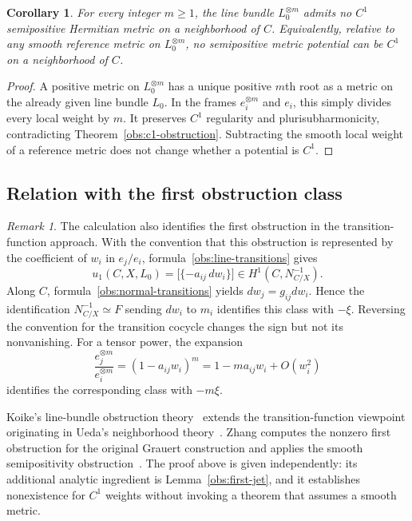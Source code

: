 \documentclass[11pt,a4paper]{article}
\numberwithin{equation}{section}
\newtheorem{corollary}[theorem]{Corollary}
\theoremstyle{definition}
\theoremstyle{remark}
\newtheorem{remark}[theorem]{Remark}
\begin{document}
\begin{corollary}
\label{obs:powers}
For every integer $m\geq1$, the line bundle $L_0^{\otimes m}$ admits
no $C^1$ semipositive Hermitian metric on a neighborhood of $C$.
Equivalently, relative to any smooth reference metric on
$L_0^{\otimes m}$, no semipositive metric potential can be $C^1$ on a
neighborhood of $C$.
\end{corollary}

\begin{proof}
A positive metric on $L_0^{\otimes m}$ has a unique positive $m$th root
as a metric on the already given line bundle $L_0$.  In the frames
$e_i^{\otimes m}$ and $e_i$, this simply divides every local weight by
$m$.  It preserves $C^1$ regularity and plurisubharmonicity, contradicting
Theorem~\ref{obs:c1-obstruction}.  Subtracting the smooth local weight
of a reference metric does not change whether a potential is $C^1$.
\end{proof}

\subsection{Relation with the first obstruction class}

\begin{remark}
\label{obs:obstruction-class}
The calculation also identifies the first obstruction in the
transition-function approach.  With the convention that this
obstruction is represented by the coefficient of $w_i$ in $e_j/e_i$,
formula~\eqref{obs:line-transitions} gives
\[
     u_1(C,X,L_0)
        =\bigl[\{-a_{ij}\,dw_i\}\bigr]
           \in H^1(C,N_{C/X}^{-1}).
\]
Along $C$, formula~\eqref{obs:normal-transitions} yields
$dw_j=g_{ij}dw_i$.  Hence the identification
$N_{C/X}^{-1}\simeq F$ sending $dw_i$ to $m_i$ identifies this class
with $-\xi$.  Reversing the convention for the transition cocycle
changes the sign but not its nonvanishing.  For a tensor power, the
expansion
\[
       \frac{e_j^{\otimes m}}{e_i^{\otimes m}}
           =(1-a_{ij}w_i)^m
           =1-ma_{ij}w_i+O(w_i^2)
\]
identifies the corresponding class with $-m\xi$.

Koike's line-bundle obstruction theory~\cite{Koike2021} extends the
transition-function viewpoint originating in Ueda's neighborhood
theory~\cite{Ueda1983}.  Zhang computes the nonzero first obstruction
for the original Grauert construction and applies the smooth
semipositivity obstruction~\cite{Zhang2025}.  The proof above is given
independently: its additional analytic ingredient is
Lemma~\ref{obs:first-jet}, and it establishes nonexistence for $C^1$
weights without invoking a theorem that assumes a smooth metric.
\end{remark}
\end{document}
